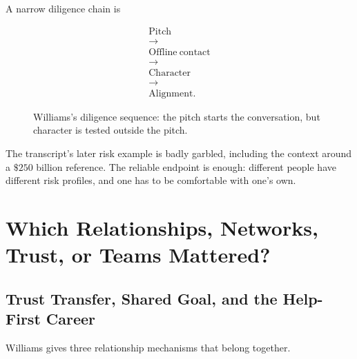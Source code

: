 \documentclass[11pt,oneside]{book}
\begin{document}
A narrow diligence chain is

\begin{equation}
\begin{gathered}
\mathrm{Pitch}\\
\longrightarrow\\
\mathrm{Offline\ contact}\\
\longrightarrow\\
\mathrm{Character}\\
\longrightarrow\\
\mathrm{Alignment}.
\end{gathered}
\end{equation}

\begin{figure}
\centering
{}
\caption{Williams's diligence sequence: the pitch starts the conversation, but character is tested outside the pitch.}
\end{figure}

The transcript's later risk example is badly garbled, including the context around a \(\$250\) billion reference. The reliable endpoint is enough: different people have different risk profiles, and one has to be comfortable with one's own.

\chapter{Which Relationships, Networks, Trust, or Teams Mattered?}

\section{Trust Transfer, Shared Goal, and the Help-First Career}

Williams gives three relationship mechanisms that belong together.
\end{document}
